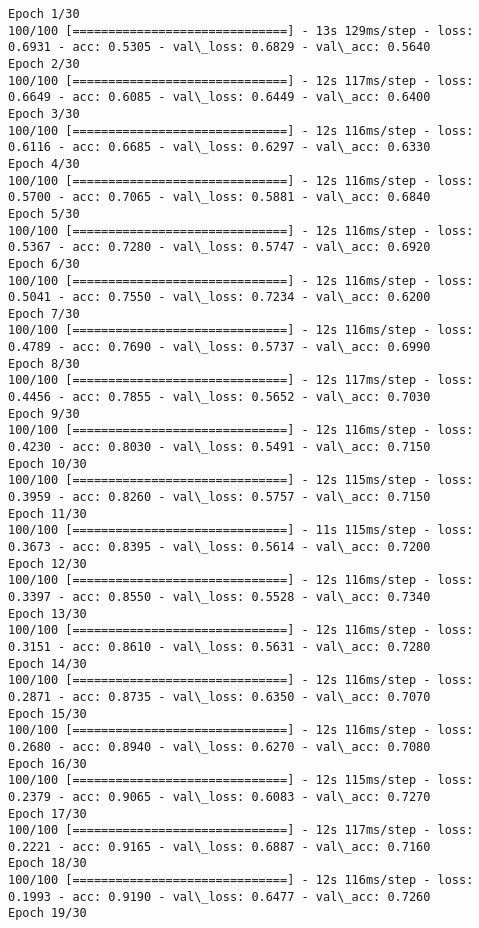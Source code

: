 \documentclass[11pt]{article}
\begin{document}
    \begin{Verbatim}[commandchars=\\\{\}]
Epoch 1/30
100/100 [==============================] - 13s 129ms/step - loss: 0.6931 - acc: 0.5305 - val\_loss: 0.6829 - val\_acc: 0.5640
Epoch 2/30
100/100 [==============================] - 12s 117ms/step - loss: 0.6649 - acc: 0.6085 - val\_loss: 0.6449 - val\_acc: 0.6400
Epoch 3/30
100/100 [==============================] - 12s 116ms/step - loss: 0.6116 - acc: 0.6685 - val\_loss: 0.6297 - val\_acc: 0.6330
Epoch 4/30
100/100 [==============================] - 12s 116ms/step - loss: 0.5700 - acc: 0.7065 - val\_loss: 0.5881 - val\_acc: 0.6840
Epoch 5/30
100/100 [==============================] - 12s 116ms/step - loss: 0.5367 - acc: 0.7280 - val\_loss: 0.5747 - val\_acc: 0.6920
Epoch 6/30
100/100 [==============================] - 12s 116ms/step - loss: 0.5041 - acc: 0.7550 - val\_loss: 0.7234 - val\_acc: 0.6200
Epoch 7/30
100/100 [==============================] - 12s 116ms/step - loss: 0.4789 - acc: 0.7690 - val\_loss: 0.5737 - val\_acc: 0.6990
Epoch 8/30
100/100 [==============================] - 12s 117ms/step - loss: 0.4456 - acc: 0.7855 - val\_loss: 0.5652 - val\_acc: 0.7030
Epoch 9/30
100/100 [==============================] - 12s 116ms/step - loss: 0.4230 - acc: 0.8030 - val\_loss: 0.5491 - val\_acc: 0.7150
Epoch 10/30
100/100 [==============================] - 12s 115ms/step - loss: 0.3959 - acc: 0.8260 - val\_loss: 0.5757 - val\_acc: 0.7150
Epoch 11/30
100/100 [==============================] - 11s 115ms/step - loss: 0.3673 - acc: 0.8395 - val\_loss: 0.5614 - val\_acc: 0.7200
Epoch 12/30
100/100 [==============================] - 12s 116ms/step - loss: 0.3397 - acc: 0.8550 - val\_loss: 0.5528 - val\_acc: 0.7340
Epoch 13/30
100/100 [==============================] - 12s 116ms/step - loss: 0.3151 - acc: 0.8610 - val\_loss: 0.5631 - val\_acc: 0.7280
Epoch 14/30
100/100 [==============================] - 12s 116ms/step - loss: 0.2871 - acc: 0.8735 - val\_loss: 0.6350 - val\_acc: 0.7070
Epoch 15/30
100/100 [==============================] - 12s 116ms/step - loss: 0.2680 - acc: 0.8940 - val\_loss: 0.6270 - val\_acc: 0.7080
Epoch 16/30
100/100 [==============================] - 12s 115ms/step - loss: 0.2379 - acc: 0.9065 - val\_loss: 0.6083 - val\_acc: 0.7270
Epoch 17/30
100/100 [==============================] - 12s 117ms/step - loss: 0.2221 - acc: 0.9165 - val\_loss: 0.6887 - val\_acc: 0.7160
Epoch 18/30
100/100 [==============================] - 12s 116ms/step - loss: 0.1993 - acc: 0.9190 - val\_loss: 0.6477 - val\_acc: 0.7260
Epoch 19/30

\end{Verbatim}
\end{document}
